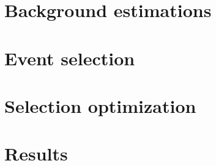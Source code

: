 \section{Background estimations}\label{sswwupgrade:background}


\section{Event selection}\label{sswwupgrade:event_selection}


\section{Selection optimization}\label{sswwupgrade:optimization}


\section{Results}\label{sswwupgrade:results}


